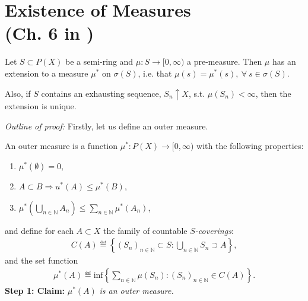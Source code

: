 \section{Existence of Measures \protect\\ (Ch. 6 in \cite{schilling2017measures})}
\begin{theorem}[Carathéodory]
    Let \(S\subset P(X)\) be a semi-ring and \(\mu:S\rightarrow[0,\infty)\) a pre-measure. Then \(\mu\) has an extension to a measure \(\mu^{*}\)
    on \(\sigma(S)\), i.e. that \(\mu(s) = \mu^{*}(s), \ \forall \ s\in \sigma(S)\). 
    
    Also, if \(S\) contains an exhausting sequence, \(S_n\uparrow X\), s.t. \(\mu(S_n) < \infty\), then the extension is 
    unique.
\end{theorem}
\emph{Outline of proof:} Firstly, let us define an outer measure. 
    \begin{definition}
        An outer measure is a function \(\mu^{*}: P(X) \rightarrow [0,\infty)\) with the following properties:
        \begin{enumerate}
            \item \(\mu^{*}(\emptyset) = 0\),
            \item \(A\subset B \Rightarrow u^{*}(A) \leq \mu^{*}(B)\),
            \item \(\mu^{*}\left( \bigcup\limits_{n\in\mathbb{N}} A_n \right)\leq \sum\limits_{n\in\mathbb{N}} \mu^{*}(A_n)\),
        \end{enumerate}
    \end{definition}
    and define for each \(A\subset X\) the family of countable \(S\)\emph{-coverings}:
    \begin{align*}
        C(A) \eqdef \left\{(S_n)_{n\in\mathbb{N}} \subset S : \bigcup\limits_{n\in\mathbb{N}} S_n\supset A\right\},
    \end{align*}
    and the set function
    \begin{align*}
        \mu^{*}(A) \eqdef \text{inf}\left\{ \sum\limits_{n\in\mathbb{N}} \mu(S_n): (S_n)_{n\in\mathbb{N}}\in C(A)\right\}.
    \end{align*}
    \textbf{Step 1: Claim: } \(\mu^{*}(A)\)\emph{ is an outer measure.}
